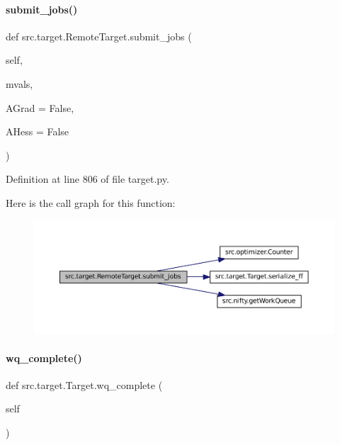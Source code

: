 \paragraph{\texorpdfstring{submit\+\_\+jobs()}{submit\_jobs()}}
{\footnotesize\ttfamily def src.\+target.\+Remote\+Target.\+submit\+\_\+jobs (\begin{DoxyParamCaption}\item[{}]{self,  }\item[{}]{mvals,  }\item[{}]{A\+Grad = {\ttfamily False},  }\item[{}]{A\+Hess = {\ttfamily False} }\end{DoxyParamCaption})}



Definition at line 806 of file target.\+py.

Here is the call graph for this function\+:
\nopagebreak
\begin{figure}[H]
\begin{center}
\leavevmode
\includegraphics[width=350pt]{classsrc_1_1target_1_1RemoteTarget_ac70aab68b1b0782e053d522dc908eb05_cgraph}
\end{center}
\end{figure}
\mbox{\label{classsrc_1_1target_1_1Target_aeb7582896efcfe1d0316a4ee80fc5634}} 
\paragraph{\texorpdfstring{wq\+\_\+complete()}{wq\_complete()}}
{\footnotesize\ttfamily def src.\+target.\+Target.\+wq\+\_\+complete (\begin{DoxyParamCaption}\item[{}]{self }\end{DoxyParamCaption})\hspace{0.3cm}{\ttfamily [inherited]}}



